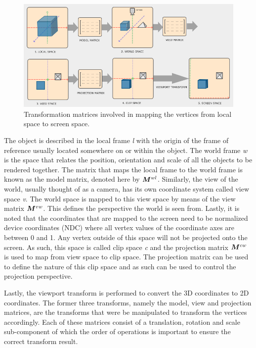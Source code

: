 
\begin{figure}[!ht]
	\centering
	\includegraphics[width=1\linewidth]{figures/transformation-matrices.PNG}
	\caption{Transformation matrices involved in mapping the vertices from local space to screen space.}
	\label{fig:transformation-matrices}
\end{figure}

The object is described in the local frame \textit{l} with the origin of the frame of reference usually located somewhere on or within the object. The world frame \textit{w} is the space  that relates the position, orientation and scale of all the objects to be rendered together. The matrix that maps the local frame to the world frame is known as the model matrix, denoted here by $\bm{M}^{wl}$. Similarly, the view of the world, usually thought of as a camera, has its own coordinate system called view space \textit{v}. The world space is mapped to this view space by means of the view matrix $\bm{M}^{vw}$. This defines the perspective the world is seen from. Lastly, it is noted that the coordinates that are mapped to the screen need to be normalized device coordinates (NDC) where all vertex values of the coordinate axes are between 0 and 1. Any vertex outside of this space will not be projected onto the screen. As such, this space is called clip space \textit{c} and the projection matrix $\bm{M}^{cw}$ is used to map from view space to clip space. The projection matrix can be used to define the nature of this clip space and as such can be used to control the projection perspective. 

Lastly, the viewport transform is performed to convert the 3D coordinates to 2D coordinates. The former three transforms, namely the model, view and projection matrices, are the transforms that were be manipulated to transform the vertices accordingly. Each of these matrices consist of a translation, rotation and scale sub-component of which the order of operations is important to ensure the correct transform result.

